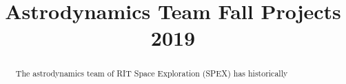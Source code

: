 \documentclass[conference]{IEEEtran} %
\title{Astrodynamics Team Fall Projects 2019 }
\author{
  \IEEEauthorblockN{%
    Amber Dubill\IEEEauthorrefmark{1},  %
    Evan Putnam\IEEEauthorrefmark{2},
    Dr. Jennifer Connelly\IEEEauthorrefmark{3}, and 
   Dr. Micheal Richmond\IEEEauthorrefmark{4},
  }
  \IEEEauthorblockA{%
    RIT Space Exploration, Rochester Institute of Technology \\ %
    Rochester, N.Y. \\
    Email:
    \IEEEauthorrefmark{1}ald4035@rit.edu,
    \IEEEauthorrefmark{2}ald4035@rit.edu,
    \IEEEauthorrefmark{3}jlcsps@rit.edu,
    \IEEEauthorrefmark{4}mwrsps@rit.edu,
  }

}
\begin{document}
\maketitle%

\begin{abstract}
   The astrodynamics team of RIT Space Exploration (SPEX) has historically 
   
   
\end{abstract}

\label{sec:nomenclature}
\newcommand{\nomunit}[1]{%
\renewcommand{\nomentryend}{\hspace*{\fill}#1}}
\renewcommand{\nompreamble}{

  }
\printnomenclature{}
\end{document}
